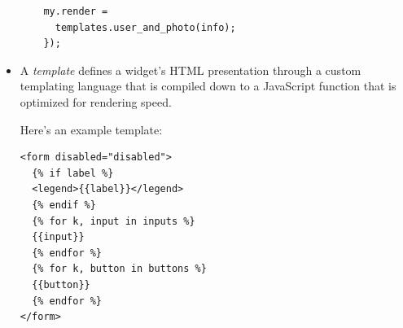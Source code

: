 \documentclass[10pt, twocolumn]{article}
\begin{document}
\begin{itemize}
\begin{verbatim}
    my.render =
      templates.user_and_photo(info);
    });
\end{verbatim}

\item A \emph{template} defines a widget's HTML presentation
  through a custom templating language that is compiled down to a
  JavaScript function that is optimized for rendering speed.

  Here's an example template:
\begin{verbatim}
<form disabled="disabled">
  {% if label %}
  <legend>{{label}}</legend>
  {% endif %}
  {% for k, input in inputs %}
  {{input}}
  {% endfor %}
  {% for k, button in buttons %}
  {{button}}
  {% endfor %}
</form>
\end{verbatim}
\end{itemize}
\end{document}
